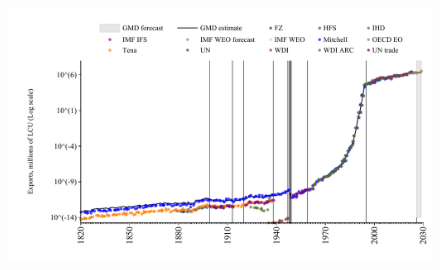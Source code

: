\documentclass[12pt,a4paper,landscape]{article}
\begin{document}
\begin{adjustbox}{max totalsize={\paperwidth}{\paperheight},center}
\begin{minipage}[t][\textheight][t]{\textwidth}
\begin{figure}[H]
\includegraphics[width=\textwidth,height=0.6\textheight,keepaspectratio]{graphs/BRA_exports.pdf}
\end{figure}
\end{minipage}
\end{adjustbox}
\end{document}
